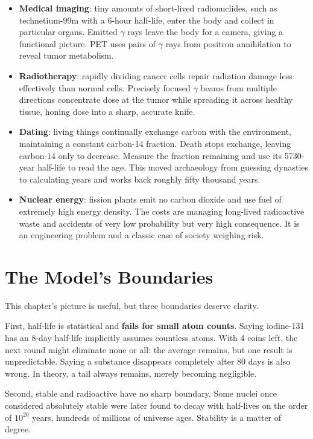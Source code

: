 \begin{itemize}[itemsep=2pt]
\item \textbf{Medical imaging}: tiny amounts of short-lived radionuclides, such as technetium-99m with a 6-hour half-life, enter the body and collect in particular organs. Emitted $\gamma$ rays leave the body for a camera, giving a functional picture. PET uses pairs of $\gamma$ rays from positron annihilation to reveal tumor metabolism.
\item \textbf{Radiotherapy}: rapidly dividing cancer cells repair radiation damage less effectively than normal cells. Precisely focused $\gamma$ beams from multiple directions concentrate dose at the tumor while spreading it across healthy tissue, honing dose into a sharp, accurate knife.
\item \textbf{Dating}: living things continually exchange carbon with the environment, maintaining a constant carbon-14 fraction. Death stops exchange, leaving carbon-14 only to decrease. Measure the fraction remaining and use its 5730-year half-life to read the age. This moved archaeology from guessing dynasties to calculating years and works back roughly fifty thousand years.
\item \textbf{Nuclear energy}: fission plants emit no carbon dioxide and use fuel of extremely high energy density. The costs are managing long-lived radioactive waste and accidents of very low probability but very high consequence. It is an engineering problem and a classic case of society weighing risk.
\end{itemize}

\section{The Model's Boundaries}

This chapter's picture is useful, but three boundaries deserve clarity.

First, half-life is statistical and \textbf{fails for small atom counts}. Saying iodine-131 has an 8-day half-life implicitly assumes countless atoms. With 4 coins left, the next round might eliminate none or all: the average remains, but one result is unpredictable. Saying a substance disappears completely after 80 days is also wrong. In theory, a tail always remains, merely becoming negligible.

Second, stable and radioactive have no sharp boundary. Some nuclei once considered absolutely stable were later found to decay with half-lives on the order of $10^{20}$ years, hundreds of millions of universe ages. Stability is a matter of degree.

